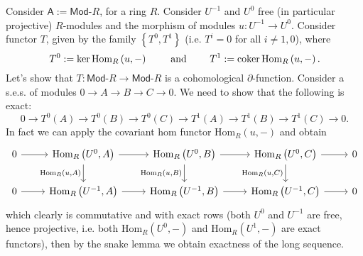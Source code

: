 \begin{ex}
	Consider $\mathsf{A} := \mathsf{Mod}\text{-}R$, for a ring $R$.
	Consider $U^{-1}$ and $U^0$ free (in particular projective) $R$-modules
	and the morphism of modules $u: U^{-1} \to U^0$.
	Consider functor $T$, given by the family $\left\{ T^0, T^1 \right\}$ (i.e. $T^i = 0$ for all $i \neq 1,0$),
	where
	\begin{equation}
	T^0 := \ker \mathrm{Hom}_{R} \left( u, - \right)
	\qquad \text{ and } \qquad
	T^1 := \operatorname{coker} \mathrm{Hom}_{R}\left( u, - \right)
	.\end{equation} 
	Let's show that $T: \mathsf{Mod}\text{-}R \to \mathsf{Mod}\text{-}R$ is a
	cohomological $\partial$-function.
	Consider a s.e.s. of modules
	$0 \to A\to B \to C \to 0$.
	We need to show that the following is exact:
	\begin{equation}
		0 \to T^0(A) \to T^0(B) \to T^0(C) \to
		T^1(A) \to T^1(B) \to T^1(C) \to 0
	.\end{equation} 
	In fact we can apply the covariant hom functor $\mathrm{Hom}_{R}\left( u, - \right)$ and obtain
	\begin{equation}
	\begin{tikzcd}
		0 \arrow[r, "", rightarrow] &
		\mathrm{Hom}_{R}\left( U^0, A \right) \arrow[r, "", rightarrow]
		\arrow[d, "{\mathrm{Hom}_{R}\left( u , A \right)}"', rightarrow] &
		\mathrm{Hom}_{R}\left( U^0, B \right) \arrow[r, "", rightarrow]
		\arrow[d, "{\mathrm{Hom}_{R}\left( u , B \right)}"', rightarrow] &
		\mathrm{Hom}_{R}\left( U^0, C \right) \arrow[r, "", rightarrow]
		\arrow[d, "{\mathrm{Hom}_{R}\left( u , C \right)}"', rightarrow] &
		0 \\
		0 \arrow[r, "", rightarrow] &
		\mathrm{Hom}_{R}\left( U^{-1}, A \right) \arrow[r, "", rightarrow] &
		\mathrm{Hom}_{R}\left( U^{-1}, B \right) \arrow[r, "", rightarrow] &
		\mathrm{Hom}_{R}\left( U^{-1}, C \right) \arrow[r, "", rightarrow] &
		0 
	\end{tikzcd}
	\end{equation} 
	which clearly is commutative and with exact rows (both $U^0$ and $U^{-1}$ are free,
	hence projective, i.e. both $\mathrm{Hom}_{ R}\left( U^0, - \right)$ and
	$\mathrm{Hom}_{ R}\left( U^{1}, - \right)$ are exact functors), then by the snake lemma
	we obtain exactness of the long sequence.


\end{ex}
